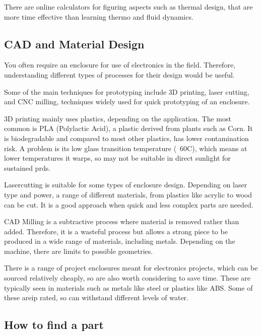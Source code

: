 \documentclass[a4paper,11pt]{report}
\begin{document}
There are online calculators for figuring aspects such as thermal design, that are more time effective than learning thermo and fluid dynamics.

\vspace*{1\baselineskip}

\subsection{CAD and Material Design}

You often require an enclosure for use of electronics in the field. Therefore, understanding different types of processes for their design would be useful.

Some of the main techniques for prototyping include 3D printing, laser cutting, and CNC milling, techniques widely used for quick prototyping of an enclosure.

3D printing mainly uses plastics, depending on the application. The most common is PLA (Polylactic Acid), a plastic derived from plants such as Corn. It is biodegradable and compared to most other plastics, has lower contamination risk. A problem is its low glass transition temperature (~60\degree C), which means at lower temperatures it warps, so may not be suitable in direct sunlight for sustained \gls{prd}s.

Lasercutting is suitable for some types of enclosure design. Depending on laser type and power, a range of different materials, from plastics like acrylic to wood can be cut. It is a good approach when quick and less complex parts are needed.

CAD Milling is a subtractive process where material is removed rather than added. Therefore, it is a wasteful process but allows a strong piece to be produced in a wide range of materials, including metals. Depending on the machine, there are limits to possible geometries.

There is a range of project enclosures meant for electronics projects, which can be sourced relatively cheaply, so are also worth considering to save time. These are typically seen in materials such as metals like steel or plastics like ABS. Some of these are\gls{ip} rated, so can withstand different levels of water.

\vspace*{1\baselineskip}

\subsection{How to find a part}
\end{document}
